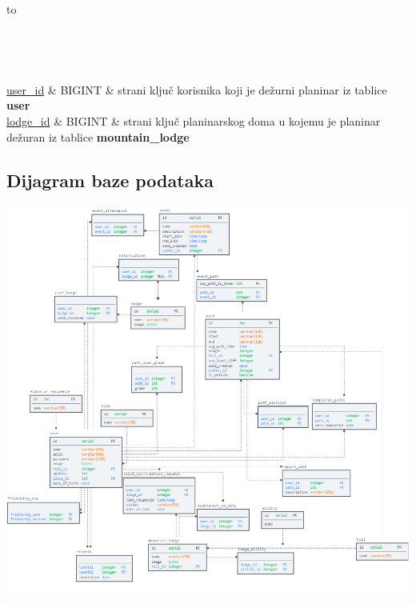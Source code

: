 			\begin{longtabu} to \textwidth {|X[6, l]|X[6, l]|X[20, l]|}
				
				\hline {}	 \\[3pt] \hline
				\endfirsthead
				
				\hline {}	 \\[3pt] \hline
				\endhead
				
				\hline 
				\endlastfoot
				
				\underline{user\_id} & BIGINT	& strani ključ korisnika koji je dežurni planinar iz tablice \textbf{user}	\\ \hline
				\underline{lodge\_id}	& BIGINT &   strani ključ planinarskog doma u kojemu je planinar dežuran iz tablice \textbf{mountain\_lodge}	\\ \hline 
				
				
			\end{longtabu}
			\vspace{10mm}



			\subsection{Dijagram baze podataka}
				
				\includegraphics[width=\linewidth]{slike/database.png}
			
